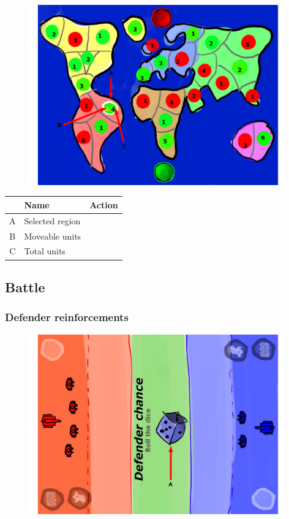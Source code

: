 \documentclass[12pt,a4paper]{article}
\begin{document}
\begin{figure}[H]
  \centering
  \includegraphics[width=11cm]{pic/mocks/5-5.pdf}
\end{figure}

\begin{table}[H]
\small
\centering
\begin{tabular}{c|p{5cm}|p{7cm}}
& Name & Action \\ \hline\hline
A
&Selected region
&
\\B
&Moveable units
&
\\C
&Total units
&
\end{tabular}
\end{table}


\subsection{Battle}\label{mock:76}

\subsubsection{Defender reinforcements}\label{mock:761}

\begin{figure}[H]
  \centering
  \includegraphics[width=11cm]{pic/mocks/6-1.pdf}
\end{figure}
\end{document}
